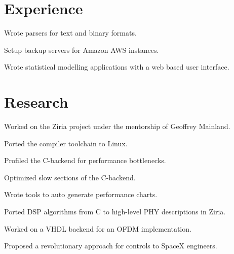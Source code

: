 \documentclass[]{deedy}
\begin{document}
\hfill
\begin{minipage}[t]{0.66\textwidth} 


\section{Experience}
\sectionsep

\vspace{\topsep} %
\begin{tightemize}
\item Wrote parsers for text and binary formats.
\item Setup backup servers for Amazon AWS instances.
\item Wrote statistical modelling applications with a web based user interface.
\end{tightemize}
\sectionsep


\section{Research}
\begin{tightemize}
\item Worked on the Ziria project under the mentorship of Geoffrey Mainland.
\item Ported the compiler toolchain to Linux.
\item Profiled the C-backend for performance bottlenecks.
\item Optimized slow sections of the C-backend.
\item Wrote tools to auto generate performance charts.
\item Ported DSP algorithms from C to high-level PHY descriptions in Ziria.
\item Worked on a VHDL backend for an OFDM implementation.
\end{tightemize}
\sectionsep

Proposed a revolutionary approach for controls to SpaceX engineers.
\sectionsep


\end{minipage}
\end{document}
